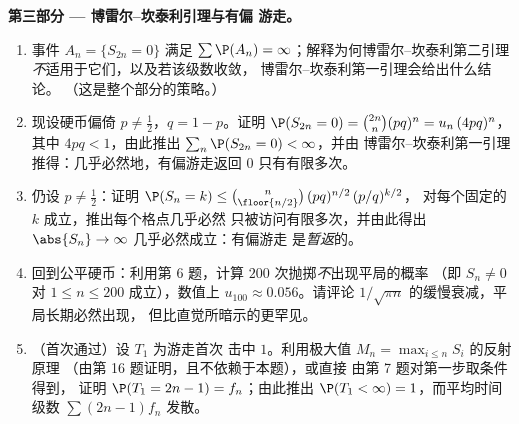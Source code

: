 \begin{problem}
\medskip
\noindent\textbf{第三部分 --- 博雷尔--坎泰利引理与有偏
游走。}
\begin{enumerate}[resume]
  \item 事件 $A_n = \{S_{2n} = 0\}$ 满足 $\sum\P(A_n)
        = \infty$；解释为何博雷尔--坎泰利第二引理
        \emph{不}适用于它们，以及若该级数收敛，
        博雷尔--坎泰利第一引理会给出什么结论。
        （这是整个部分的策略。）
  \item 现设硬币偏倚 $p \neq \frac12$，$q = 1 -
        p$。证明 $\P(S_{2n} = 0) = \binom{2n}n(pq)^n =
        u_n\,(4pq)^n$，其中 $4pq < 1$，由此推出
        $\sum_n\P(S_{2n} = 0) < \infty$，并由
        博雷尔--坎泰利第一引理推得：几乎必然地，有偏游走返回 $0$
        只有有限多次。
  \item 仍设 $p \neq \frac12$：证明 $\P(S_n = k) \leq
        \binom{n}{\floor{n/2}}\,(pq)^{n/2}\,(p/q)^{k/2}$，
        对每个固定的 $k$ 成立，推出每个格点几乎必然
        只被访问有限多次，并由此得出
        $\abs{S_n} \to \infty$ 几乎必然成立：有偏游走
        是\emph{暂返}的。
  \item 回到公平硬币：利用第 6 题，计算
        $200$ 次抛掷\emph{不}出现平局的概率
        （即 $S_n \neq 0$ 对 $1 \leq n \leq 200$ 成立），数值上
        $u_{100} \approx 0.056$。请评论
        $1/\sqrt{\pi n}$ 的缓慢衰减，平局长期必然出现，
        但比直觉所暗示的更罕见。
  \item （首次通过）设 $T_1$ 为游走首次
        击中 $1$。利用极大值
        $M_n = \max_{i\leq n}S_i$ 的反射原理
        （由第 16 题证明，且不依赖于本题），或直接
        由第 7 题对第一步取条件得到，
        证明 $\P(T_1 = 2n - 1) = f_n$；由此推出 $\P(T_1 <
        \infty) = 1$，而平均时间级数
        $\sum(2n-1)f_n$ 发散。
\end{enumerate}


\end{problem}

